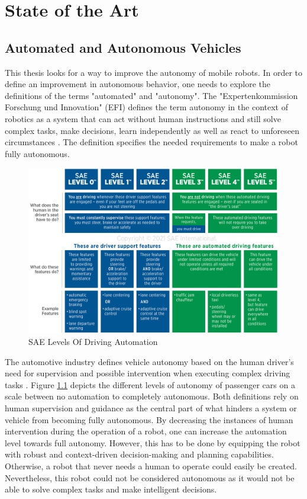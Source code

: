 \chapter{State of the Art}
\label{cha:state of the art}

\section{Automated and Autonomous Vehicles}

This thesis looks for a way to improve the autonomy of mobile robots. In order to define an improvement in autonomous behavior, one needs to explore the definitions of the terms "automated" and "autonomy". 
The "Expertenkommission Forschung und Innovation" (EFI) defines the term autonomy in the context of robotics as a system that can act without human instructions and still solve complex tasks, make decisions, learn independently as well as react to unforeseen circumstances \cite{efi2018}. The definition specifies the needed requirements to make a robot fully autonomous. 
\begin{figure}[ht]
	\includegraphics[width=1.0\textwidth]{images/j3016graphic_2021.png}
	\caption{SAE Levels Of Driving Automation \cite{J3016_202104}}
	\label{fig:sae_levels}
\end{figure}
The automotive industry defines vehicle autonomy based on the human driver's need for supervision and possible intervention when executing complex driving tasks \cite{J3016_202104}. Figure \ref{fig:sae_levels} depicts the different levels of autonomy of passenger cars on a scale between no automation to completely autonomous. 
Both definitions rely on human supervision and guidance as the central part of what hinders a system or vehicle from becoming fully autonomous. By decreasing the instances of human intervention during the operation of a robot, one can increase the automation level towards full autonomy. However, this has to be done by equipping the robot with robust and context-driven decision-making and planning capabilities. Otherwise, a robot that never needs a human to operate could easily be created. Nevertheless, this robot could not be considered autonomous as it would not be able to solve complex tasks and make intelligent decisions.

